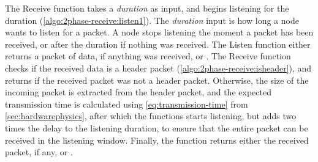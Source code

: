 The Receive function takes a \textit{duration} as input, and begins listening for the duration
(\autoref{algo:2phase-receive:listen1}). The \textit{duration} input is how long a node wants to listen for a
packet. A node stops listening the moment a packet has been received, or after the duration if nothing was
received. The Listen function either returns a packet of data, if anything was received, or \KwNull. The
Receive function checks if the received data is a header packet (\autoref{algo:2phase-receive:isheader}), and
returns \KwNull if the received packet was not a header packet. Otherwise, the size of the incoming packet is
extracted from the header packet, and the expected transmission time is calculated using
\autoref{eq:transmission-time} from \autoref{sec:hardwarephysics}, after which the functions starts listening,
but adds two times the delay to the listening duration, to ensure that the entire packet can be received in
the listening window. Finally, the function returns either the received packet, if any, or \KwNull.